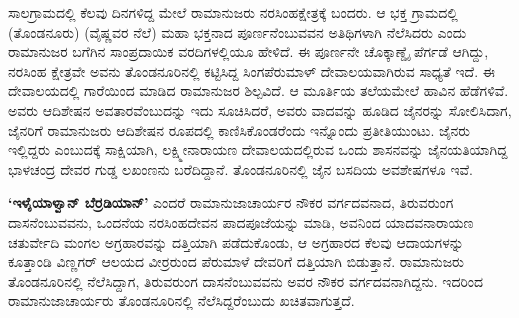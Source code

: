 \vskip 2pt

ಸಾಲಗ್ರಾಮದಲ್ಲಿ ಕೆಲವು ದಿನಗಳಿದ್ದ ಮೇಲೆ ರಾಮಾನುಜರು ನರಸಿಂಹಕ್ಷೇತ್ರಕ್ಕೆ ಬಂದರು. ಆ ಭಕ್ತ ಗ್ರಾಮದಲ್ಲಿ (ತೊಂಡನೂರು) (ವೈಷ್ಣವರ ನೆಲೆ) ಮಹಾ ಭಕ್ತನಾದ ಪೂರ್ಣನೆಂಬುವವನ ಅತಿಥಿಗಳಾಗಿ ನೆಲೆಸಿದರು ಎಂದು ರಾಮಾನುಜರ ಬಗೆಗಿನ ಸಾಂಪ್ರದಾಯಿಕ ವರದಿಗಳಲ್ಲಿಯೂ ಹೇಳಿದೆ. ಈ ಪೂರ್ಣನೇ ಚೊಕ್ಕಾಣ್ಡೈ ಪೆರ್ಗಡೆ ಆಗಿದ್ದು, ನರಸಿಂಹ ಕ್ಷೇತ್ರವೇ ಅವನು ತೊಂಡನೂರಿನಲ್ಲಿ ಕಟ್ಟಿಸಿದ್ದ ಸಿಂಗಪೆರುಮಾಳ್​ ದೇವಾಲಯವಾಗಿರುವ ಸಾಧ್ಯತೆ ಇದೆ. ಈ ದೇವಾಲಯದಲ್ಲಿ ಗಾರೆಯಿಂದ ಮಾಡಿದ ರಾಮಾನುಜರ ಶಿಲ್ಪವಿದೆ. ಆ ಮೂರ್ತಿಯ ತಲೆಯಮೇಲೆ ಹಾವಿನ ಹೆಡೆಗಳಿವೆ. ಅವರು ಆದಿಶೇಷನ ಅವತಾರವೆಂಬುದನ್ನು ಇದು ಸೂಚಿಸಿದರೆ, ಅವರು ವಾದವನ್ನು ಹೂಡಿದ ಜೈನರನ್ನು ಸೋಲಿಸಿದಾಗ, ಜೈನರಿಗೆ ರಾಮಾನುಜರು ಆದಿಶೇಷನ ರೂಪದಲ್ಲಿ ಕಾಣಿಸಿಕೊಂಡರೆಂದು ಇನ್ನೊಂದು ಪ್ರತೀತಿಯುಂಟು. ಜೈನರು ಇಲ್ಲಿದ್ದರು ಎಂಬುದಕ್ಕೆ ಸಾಕ್ಷಿಯಾಗಿ, ಲಕ್ಷ್ಮೀನಾರಾಯಣ ದೇವಾಲಯದಲ್ಲಿರುವ ಒಂದು ಶಾಸನವನ್ನು ಜೈನಯತಿಯಾಗಿದ್ದ ಭಾಳಚಂದ್ರ ದೇವರ ಗುಡ್ಡ ಲಖಂಣನು ಬರೆದಿದ್ದಾನೆ. ತೊಂಡನೂರಿನಲ್ಲಿ ಜೈನ ಬಸದಿಯ ಅವಶೇಷಗಳೂ ಇವೆ.

\vskip 2pt

\textbf{‘ಇಳೈಯಾಳ್ವಾನ್​ ಬೆರ್ರಡಿಯಾನ್​’} ಎಂದರೆ ರಾಮಾನುಜಾಚಾರ್ಯರ ನೌಕರ ವರ್ಗದವನಾದ, ತಿರುವರುಂಗ ದಾಸನೆಂಬುವವನು, ಒಂದನೆಯ ನರಸಿಂಹದೇವನ ಪಾದಪೂಜೆಯನ್ನು ಮಾಡಿ, ಅವನಿಂದ ಯಾದವನಾರಾಯಣ ಚತುರ್ವೇದಿ ಮಂಗಲ ಅಗ್ರಹಾರವನ್ನು ದತ್ತಿಯಾಗಿ ಪಡೆದುಕೊಂಡು, ಆ ಅಗ್ರಹಾರದ ಕೆಲವು ಆದಾಯಗಳನ್ನು ಕೂತ್ತಾಂಡಿ ವಿಣ್ಣಗರ್​ ಆಲಯದ ವೀರ್ರರುಂದ ಪೆರುಮಾಳೆ ದೇವರಿಗೆ ದತ್ತಿಯಾಗಿ ಬಿಡುತ್ತಾನೆ. ರಾಮಾನುಜರು ತೊಂಡನೂರಿನಲ್ಲಿ ನೆಲೆಸಿದ್ದಾಗ, ತಿರುವರುಂಗ ದಾಸನೆಂಬುವವನು ಅವರ ನೌಕರ ವರ್ಗದವನಾಗಿದ್ದನು. ಇದರಿಂದ ರಾಮಾನುಜಾಚಾರ್ಯರು ತೊಂಡನೂರಿ\-ನಲ್ಲಿ ನೆಲೆಸಿದ್ದರೆಂಬುದು ಖಚಿತವಾಗುತ್ತದೆ.

\vskip 2pt

